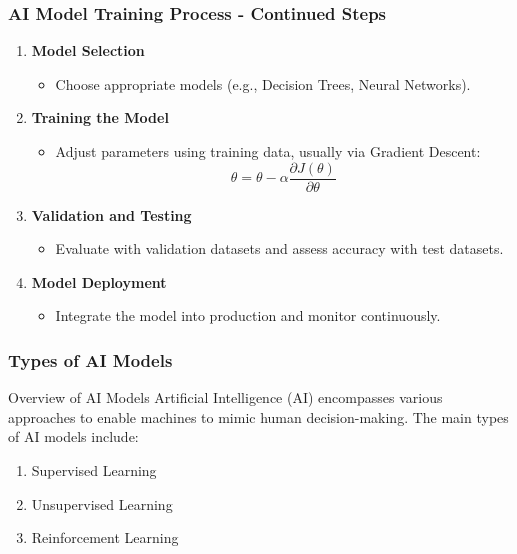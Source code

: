 \documentclass[aspectratio=169]{beamer}
\begin{document}
\begin{frame}[fragile]
    \frametitle{AI Model Training Process - Continued Steps}
    \begin{enumerate}[resume]
        \item \textbf{Model Selection}
            \begin{itemize}
                \item Choose appropriate models (e.g., Decision Trees, Neural Networks).
            \end{itemize}

        \item \textbf{Training the Model}
            \begin{itemize}
                \item Adjust parameters using training data, usually via Gradient Descent:
                \begin{equation}
                \theta = \theta - \alpha \frac{\partial J(\theta)}{\partial \theta}
                \end{equation}
            \end{itemize}

        \item \textbf{Validation and Testing}
            \begin{itemize}
                \item Evaluate with validation datasets and assess accuracy with test datasets.
            \end{itemize}

        \item \textbf{Model Deployment}
            \begin{itemize}
                \item Integrate the model into production and monitor continuously.
            \end{itemize}
    \end{enumerate}
\end{frame}

\begin{frame}
    \frametitle{Types of AI Models}
    \begin{block}{Overview of AI Models}
        Artificial Intelligence (AI) encompasses various approaches to enable machines to mimic human decision-making. The main types of AI models include:
    \end{block}
    \begin{enumerate}
        \item Supervised Learning
        \item Unsupervised Learning
        \item Reinforcement Learning
    \end{enumerate}
\end{frame}
\end{document}

